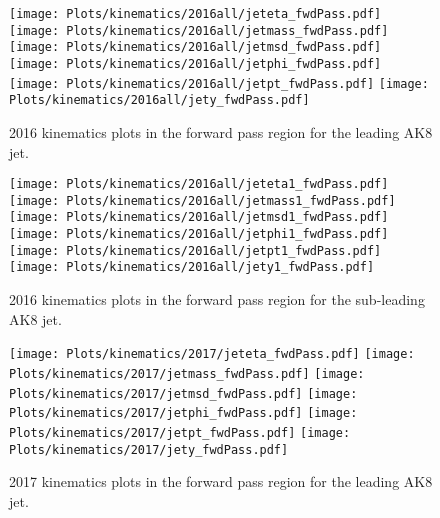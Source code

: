 \begin{figure}[htp]
	\begin{center}
		
		\texttt{[image: Plots/kinematics/2016all/jeteta\_fwdPass.pdf]}
		\texttt{[image: Plots/kinematics/2016all/jetmass\_fwdPass.pdf]}
		\texttt{[image: Plots/kinematics/2016all/jetmsd\_fwdPass.pdf]}
		\texttt{[image: Plots/kinematics/2016all/jetphi\_fwdPass.pdf]}
		\texttt{[image: Plots/kinematics/2016all/jetpt\_fwdPass.pdf]}
		\texttt{[image: Plots/kinematics/2016all/jety\_fwdPass.pdf]}
		
		\caption{2016 kinematics plots in the forward pass region for the leading AK8 jet.}
		\label{fig:kin2016_fwdPass}
	\end{center}
\end{figure}



\begin{figure}[htp]
	\begin{center}

		\texttt{[image: Plots/kinematics/2016all/jeteta1\_fwdPass.pdf]}
		\texttt{[image: Plots/kinematics/2016all/jetmass1\_fwdPass.pdf]}
		\texttt{[image: Plots/kinematics/2016all/jetmsd1\_fwdPass.pdf]}
		\texttt{[image: Plots/kinematics/2016all/jetphi1\_fwdPass.pdf]}
		\texttt{[image: Plots/kinematics/2016all/jetpt1\_fwdPass.pdf]}
		\texttt{[image: Plots/kinematics/2016all/jety1\_fwdPass.pdf]}

		\caption{2016 kinematics plots in the forward pass region for the sub-leading AK8 jet.}
		\label{fig:kin2016_fwdPass}
	\end{center}
\end{figure}



\begin{figure}[htp]
	\begin{center}
		
		\texttt{[image: Plots/kinematics/2017/jeteta\_fwdPass.pdf]}
		\texttt{[image: Plots/kinematics/2017/jetmass\_fwdPass.pdf]}
		\texttt{[image: Plots/kinematics/2017/jetmsd\_fwdPass.pdf]}
		\texttt{[image: Plots/kinematics/2017/jetphi\_fwdPass.pdf]}
		\texttt{[image: Plots/kinematics/2017/jetpt\_fwdPass.pdf]}
		\texttt{[image: Plots/kinematics/2017/jety\_fwdPass.pdf]}
		
		\caption{2017 kinematics plots in the forward pass region for the leading AK8 jet.}
		\label{fig:kin2017_fwdPass}
	\end{center}
\end{figure}



